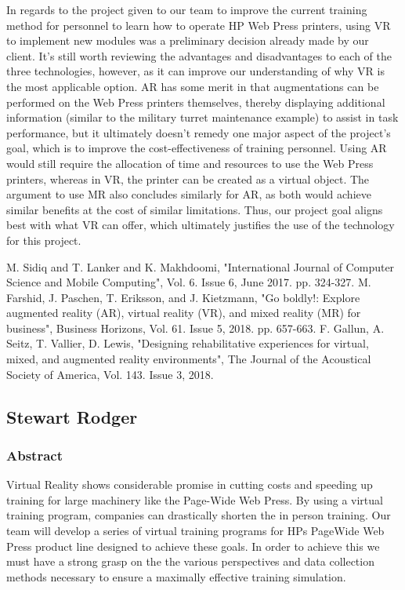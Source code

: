 \documentclass[onecolumn, draftclsnofoot,10pt, compsoc]{IEEEtran}
\begin{document}
    In regards to the project given to our team to improve the current training method for personnel to learn how to operate HP Web Press printers, using VR to implement new modules was a preliminary decision already made by our client. It's still worth reviewing the advantages and disadvantages to each of the three technologies, however, as it can improve our understanding of why VR is the most applicable option. AR has some merit in that augmentations can be performed on the Web Press printers themselves, thereby displaying additional information (similar to the military turret maintenance example) to assist in task performance, but it ultimately doesn't remedy one major aspect of the project's goal, which is to improve the cost-effectiveness of training personnel. Using AR would still require the allocation of time and resources to use the Web Press printers, whereas in VR, the printer can be created as a virtual object. The argument to use MR also concludes similarly for AR, as both would achieve similar benefits at the cost of similar limitations. Thus, our project goal aligns best with what VR can offer, which ultimately justifies the use of the technology for this project. 


\begin{thebibliography}{}
M. Sidiq and T. Lanker and K. Makhdoomi, "International Journal of Computer Science and Mobile Computing", Vol. 6. Issue 6, June 2017. pp. 324-327.
M. Farshid, J. Paschen, T. Eriksson, and J. Kietzmann, "Go boldly!: Explore augmented reality (AR), virtual reality (VR), and mixed reality (MR) for business", Business Horizons, Vol. 61. Issue 5, 2018. pp. 657-663.
F. Gallun, A. Seitz, T. Vallier, D. Lewis,  "Designing rehabilitative experiences for virtual, mixed, and augmented reality environments", The Journal of the Acoustical Society of America, Vol. 143. Issue 3, 2018.
\end{thebibliography}



\subsection{Stewart Rodger}

\subsubsection*{Abstract}
Virtual Reality shows considerable promise in cutting costs and speeding up training for large machinery like the Page-Wide Web Press. By using a virtual training program, companies can drastically shorten the in person training. Our team will develop a series of virtual training programs for HPs PageWide Web Press product line designed to achieve these goals. In order to achieve this we must have a strong grasp on the the various perspectives and data collection methods necessary to ensure a maximally effective training simulation.      
\end{document}
